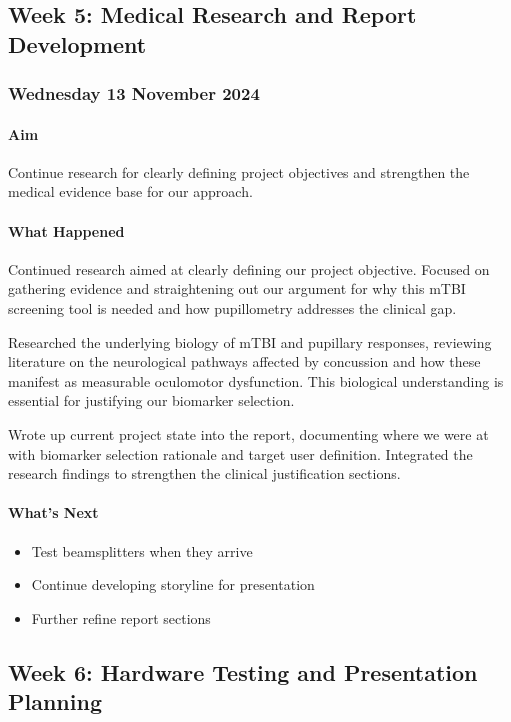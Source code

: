 \subsection{Week 5: Medical Research and Report Development}

\subsubsection*{Wednesday 13 November 2024}

\paragraph{Aim}
Continue research for clearly defining project objectives and strengthen the medical evidence base for our approach.

\paragraph{What Happened}
Continued research aimed at clearly defining our project objective. Focused on gathering evidence and straightening out our argument for why this mTBI screening tool is needed and how pupillometry addresses the clinical gap.

Researched the underlying biology of mTBI and pupillary responses, reviewing literature on the neurological pathways affected by concussion and how these manifest as measurable oculomotor dysfunction. This biological understanding is essential for justifying our biomarker selection.

Wrote up current project state into the report, documenting where we were at with biomarker selection rationale and target user definition. Integrated the research findings to strengthen the clinical justification sections.

\paragraph{What's Next}
\begin{itemize}
    \item Test beamsplitters when they arrive
    \item Continue developing storyline for presentation
    \item Further refine report sections
\end{itemize}

\subsection{Week 6: Hardware Testing and Presentation Planning}

